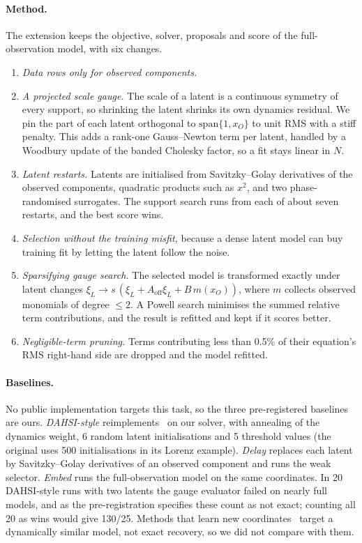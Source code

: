 \paragraph{Method.} The extension keeps the objective, solver, proposals and score of the full-observation model, with six changes.
\begin{enumerate}[leftmargin=*,itemsep=1pt]
\item \emph{Data rows only for observed components.}
\item \emph{A projected scale gauge.} The scale of a latent is a continuous symmetry of every support, so shrinking the latent shrinks its own dynamics residual. We pin the part of each latent orthogonal to $\mathrm{span}\{1,x_O\}$ to unit RMS with a stiff penalty. This adds a rank-one Gauss--Newton term per latent, handled by a Woodbury update of the banded Cholesky factor, so a fit stays linear in $N$.
\item \emph{Latent restarts.} Latents are initialised from Savitzky--Golay derivatives of the observed components, quadratic products such as $x^2$, and two phase-randomised surrogates. The support search runs from each of about seven restarts, and the best score wins.
\item \emph{Selection without the training misfit,} because a dense latent model can buy training fit by letting the latent follow the noise.
\item \emph{Sparsifying gauge search.} The selected model is transformed exactly under latent changes $\xi_L\to s\,(\xi_L+A_{\mathrm{off}}\xi_L+B\,m(x_O))$, where $m$ collects observed monomials of degree $\le2$. A Powell search minimises the summed relative term contributions, and the result is refitted and kept if it scores better.
\item \emph{Negligible-term pruning.} Terms contributing less than 0.5\% of their equation's RMS right-hand side are dropped and the model refitted.
\end{enumerate}

\paragraph{Baselines.} No public implementation targets this task, so the three pre-registered baselines are ours. \emph{DAHSI-style} reimplements~\citep{ribera2022dahsi} on our solver, with annealing of the dynamics weight, 6 random latent initialisations and 5 threshold values (the original uses 500 initialisations in its Lorenz example). \emph{Delay} replaces each latent by Savitzky--Golay derivatives of an observed component and runs the weak selector. \emph{Embed} runs the full-observation model on the same coordinates. In 20 DAHSI-style runs with two latents the gauge evaluator failed on nearly full models, and as the pre-registration specifies these count as not exact; counting all 20 as wins would give 130/25. Methods that learn new coordinates~\citep{champion2019coordinates,bakarji2023delay} target a dynamically similar model, not exact recovery, so we did not compare with them.


